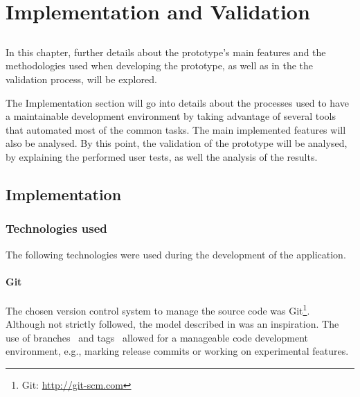 

\chapter{Implementation and Validation}
\label{chap:chap4}

\section*{}

In this chapter, further details about the prototype's main features and the methodologies used when developing the prototype, as well as in the the validation process, will be explored.

The Implementation section will go into details about the processes used to have a maintainable development environment by taking advantage of several tools that automated most of the common tasks. The main implemented features will also be analysed.
By this point, the validation of the prototype will be analysed, by explaining the performed user tests, as well the analysis of the results.

\section{Implementation} %
\label{sec:implementation}
    
  \subsection{Technologies used} %
  \label{sub:technologies}

    The following technologies were used during the development of the application.

    \subsubsection{Git} %
    \label{ssub:git}
    
    The chosen version control system to manage the source code was Git\footnote{Git: \url{http://git-scm.com}}. \\
    Although not strictly followed, the model described in \cite{nviebranching} was an inspiration.
    The use of branches~\cite{gitbranches} and tags~\cite{gittags} allowed for a manageable code development environment, e.g., marking release commits or working on experimental features.


